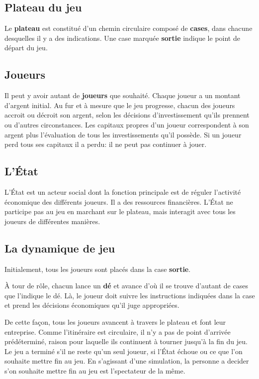 \documentclass[12pt]{article}
\begin{document}
    \subsection{Plateau du jeu}
    Le \textbf{plateau} est constitué d'un chemin circulaire composé de \textbf{cases},
dans chacune desquelles il y a des indications. Une case marquée \textbf{sortie}
indique le point de départ du jeu.

    \subsection{Joueurs}
   
    Il peut y avoir autant de \textbf{joueurs} que souhaité. Chaque joueur a un
montant d'argent initial. Au fur et à mesure que le jeu progresse, chacun des joueurs accroit
ou décroit son argent, selon les décisions d'investissement qu'ils prennent ou d'autres
circonstances. Les capitaux propres d'un joueur correspondent à
son argent plus l'évaluation de tous les investissements qu'il possède.
Si un joueur perd tous ses capitaux il a perdu: il ne peut pas continuer à jouer.
    
    \subsection{L'\'Etat}
    L'\'Etat est un acteur social dont la fonction principale est de réguler l'activité économique des
différents joueurs. Il a des ressources financières. L'État ne participe pas
au jeu en marchant sur le plateau, mais interagit avec tous les joueurs de différentes manières.


    \subsection{La dynamique de jeu}
    Initialement, tous les joueurs sont placés dans la case \textbf{sortie}. 
    
    À tour de rôle, chacun lance
un \textbf{dé} et avance d'où il se trouve d'autant de cases que l'indique le dé. 
    Là, le joueur doit suivre les instructions indiquées dans la case et prend les décisions économiques qu'il juge appropriées.
    
    De cette façon, tous les joueurs avancent à travers le plateau et font leur
entreprise. 
Comme l'itinéraire est circulaire, il n'y a pas de point d'arrivée prédéterminé,
raison pour laquelle ils continuent à tourner jusqu'à la fin du jeu. 
Le jeu a terminé s'il ne reste qu'un seul joueur, si l'État échoue ou ce que l'on souhaite mettre fin au jeu.
En s'agissant d'une simulation, la personne a decider s'on souhaite mettre fin au jeu est l'spectateur de la même.
\end{document}
